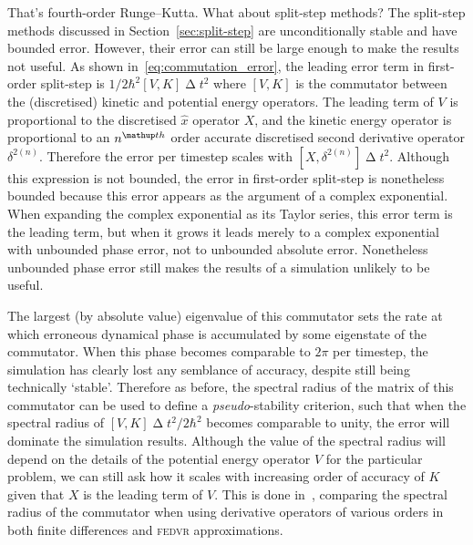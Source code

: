 That's fourth-order Runge--Kutta. What about split-step methods? The split-step methods discussed in Section~\ref{sec:split-step} are unconditionally stable and have bounded error. However, their error can still be large enough to make the results not useful. As shown in~\eqref{eq:commutation_error}, the leading error term in first-order split-step is $1/2\hbar^2[V, K]\upDelta t^2$ where $[V, K]$ is the commutator between the (discretised) kinetic and potential energy operators. The leading term of $V$ is proportional to the discretised $\hat x$ operator $X$, and the kinetic energy operator is proportional to an $n^\up{th}$ order accurate discretised second derivative operator $\delta^{2 (n)}$. Therefore the error per timestep scales with $[X, \delta^{2 (n)}]\upDelta t^2$. Although this expression is not bounded, the error in first-order split-step is nonetheless bounded because this error appears as the argument of a complex exponential. When expanding the complex exponential as its Taylor series, this error term is the leading term, but when it grows it leads merely to a complex exponential with unbounded phase error, not to unbounded absolute error. Nonetheless unbounded phase error still makes the results of a simulation unlikely to be useful.

The largest (by absolute value) eigenvalue of this commutator sets the rate at which erroneous dynamical phase is accumulated by some eigenstate of the commutator. When this phase becomes comparable to $2\pi$ per timestep, the simulation has clearly lost any semblance of accuracy, despite still being technically `stable'. Therefore as before, the spectral radius of the matrix of this commutator can be used to define a \emph{pseudo}-stability criterion, such that when the spectral radius of $[V, K]\upDelta t^2/2\hbar^2$ becomes comparable to unity, the error will dominate the simulation results. Although the value of the spectral radius will depend on the details of the potential energy operator $V$ for the particular problem, we can still ask how it scales with increasing order of accuracy of $K$ given that $X$ is the leading term of $V$. This is done in~, comparing the spectral radius of the commutator when using derivative operators of various orders in both finite differences and \textsc{fedvr} approximations.

